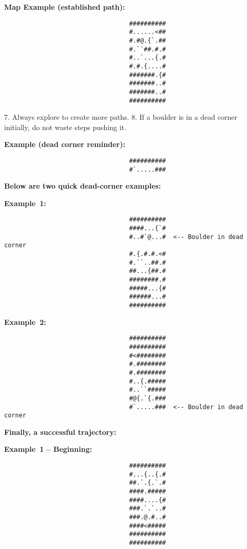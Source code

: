 \begin{MyGreenBox}[frametitle={\textbf{Iteration 2 MiniHack Prompt}}]
{\textbf{Map Example (established path):}
\begin{verbatim}
                                  ##########
                                  #......<##
                                  #.#@.{`.##
                                  #.``##.#.#
                                  #..`...{.#
                                  #.#.{....#
                                  #######.{#
                                  #######..#
                                  #######..#
                                  ##########
\end{verbatim}

7. Always explore to create more paths.  
8. If a boulder is in a dead corner initially, do not waste steps pushing it.  

\textbf{Example (dead corner reminder):}
\begin{verbatim}
                                  ##########
                                  #`.....###
\end{verbatim}

\textbf{Below are two quick dead-corner examples:}

\textbf{Example 1:}
\begin{verbatim}
                                  ##########
                                  ####...{`#
                                  #..#`@...#  <-- Boulder in dead corner
                                  #.{.#.#.<#
                                  #.``..##.#
                                  ##...{##.#
                                  ########.#
                                  #####...{#
                                  ######...#
                                  ##########
\end{verbatim}

\textbf{Example 2:}
\begin{verbatim}
                                  ##########
                                  ##########
                                  #<########
                                  #.########
                                  #.########
                                  #..{.#####
                                  #..``#####
                                  #@{.`{.###
                                  #`.....###  <-- Boulder in dead corner
\end{verbatim}

\textbf{Finally, a successful trajectory:}

\textbf{Example 1 – Beginning:}
\begin{verbatim}
                                  ##########
                                  #...{..{.#
                                  ##.`.{.`.#
                                  ####.#####
                                  ####....{#
                                  ###.`.`..#
                                  ###.@.#..#
                                  ####<#####
                                  ##########
                                  ##########
\end{verbatim}

}
\end{MyGreenBox}

